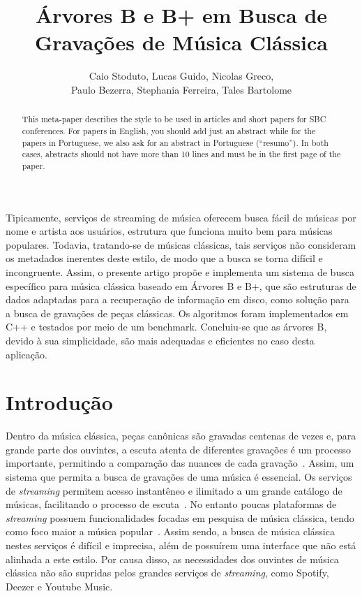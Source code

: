 \documentclass[12pt]{article}
\title{Árvores B e B\nolinebreak+ em Busca de Gravações de Música Clássica\\}
\author{Caio Stoduto\inst{1}, Lucas Guido\inst{1}, Nicolas Greco\inst{1},\\
Paulo Bezerra\inst{1}, Stephania Ferreira\inst{1}, Tales Bartolome\inst{1}}
\begin{document}
 

\maketitle

\begin{abstract}
  This meta-paper describes the style to be used in articles and short papers
  for SBC conferences. For papers in English, you should add just an abstract
  while for the papers in Portuguese, we also ask for an abstract in Portuguese
  (``resumo''). In both cases, abstracts should not have more than 10 lines and
  must be in the first page of the paper.
\end{abstract}
     
\begin{resumo} 
  Tipicamente, serviços de streaming de música oferecem busca fácil de músicas
  por nome e artista aos usuários, estrutura que funciona muito bem para músicas
  populares.
  Todavia, tratando-se de músicas clássicas, tais serviços não consideram os 
  metadados inerentes deste estilo, de modo que a busca se torna difícil e incongruente.
  Assim, o presente artigo propõe e implementa um sistema de busca específico para música
  clássica baseado em Árvores B e B+, que são estruturas de dados adaptadas para a
  recuperação de informação em disco, como solução para a busca de gravações de
  peças clássicas.
  Os algoritmos foram implementados em C++ e testados por meio de um benchmark.
  Concluiu-se que as árvores B, devido à sua simplicidade, são mais adequadas e
  eficientes no caso desta aplicação.
\end{resumo}

\section{Introdução}
Dentro da música clássica, peças canônicas são gravadas centenas de vezes e,
para grande parte dos ouvintes, a escuta atenta de diferentes gravações é um
processo importante, permitindo a comparação das nuances de cada gravação~\cite{Bl:25}.
Assim, um sistema que permita a busca de gravações de uma música é essencial.
Os serviços de \emph{streaming} permitem acesso instantêneo e ilimitado a um
grande catálogo de músicas, facilitando o processo de escuta~\cite{MoVi:18}.
No entanto poucas plataformas de \emph{streaming} possuem funcionalidades focadas em
pesquisa de música clássica, tendo como foco maior a música popular~\cite{Bl:25}.
Assim sendo, a busca de música clássica nestes serviços é difícil e imprecisa, 
além de possuírem uma interface que não está alinhada a este estilo.
Por causa disso, as necessidades dos ouvintes de música clássica não são supridas
pelos grandes serviços de \emph{streaming}, como Spotify, Deezer e Youtube Music.
\end{document}
